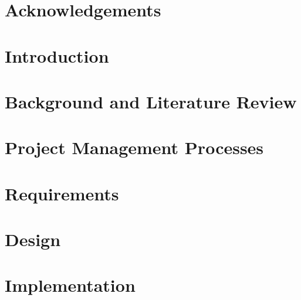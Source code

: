 \documentclass[12pt]{report}
\newcommand\blankpage{%
    \null
    \thispagestyle{empty}%
    \addtocounter{page}{-1}%
    \newpage}
\begin{document}


\afterpage{\blankpage}

\thispagestyle{plain}



\setcounter{tocdepth}{2}
\tableofcontents

\setcounter{tocdepth}{1}
\listoffigures

\setcounter{tocdepth}{1}
\listoftables


\printnomenclature[1in]

\chapter*{Acknowledgements}

\afterpage{\blankpage}


\chapter{Introduction}


\chapter{Background and Literature Review}


\chapter{Project Management Processes}


\chapter{Requirements}


\chapter{Design}


\chapter{Implementation}

\end{document}
